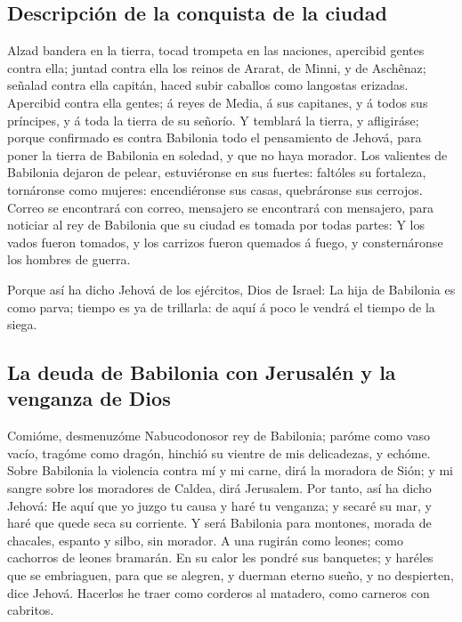 \hypertarget{descripciuxf3n-de-la-conquista-de-la-ciudad}{%
\subsection{Descripción de la conquista de la
ciudad}\label{descripciuxf3n-de-la-conquista-de-la-ciudad}}

 Alzad bandera en la tierra, tocad trompeta en las
naciones, apercibid gentes contra ella; juntad contra ella los reinos de
Ararat, de Minni, y de Aschênaz; señalad contra ella capitán, haced
subir caballos como langostas erizadas.  Apercibid contra
ella gentes; á reyes de Media, á sus capitanes, y á todos sus príncipes,
y á toda la tierra de su señorío.  Y temblará la tierra, y
afligiráse; porque confirmado es contra Babilonia todo el pensamiento de
Jehová, para poner la tierra de Babilonia en soledad, y que no haya
morador.  Los valientes de Babilonia dejaron de pelear,
estuviéronse en sus fuertes: faltóles su fortaleza, tornáronse como
mujeres: encendiéronse sus casas, quebráronse sus cerrojos.
 Correo se encontrará con correo, mensajero se encontrará
con mensajero, para noticiar al rey de Babilonia que su ciudad es tomada
por todas partes:  Y los vados fueron tomados, y los
carrizos fueron quemados á fuego, y consternáronse los hombres de
guerra.

 Porque así ha dicho Jehová de los ejércitos, Dios de
Israel: La hija de Babilonia es como parva; tiempo es ya de trillarla:
de aquí á poco le vendrá el tiempo de la siega.

\hypertarget{la-deuda-de-babilonia-con-jerusaluxe9n-y-la-venganza-de-dios}{%
\subsection{La deuda de Babilonia con Jerusalén y la venganza de
Dios}\label{la-deuda-de-babilonia-con-jerusaluxe9n-y-la-venganza-de-dios}}

 Comióme, desmenuzóme Nabucodonosor rey de Babilonia;
paróme como vaso vacío, tragóme como dragón, hinchió su vientre de mis
delicadezas, y echóme.  Sobre Babilonia la violencia contra
mí y mi carne, dirá la moradora de Sión; y mi sangre sobre los moradores
de Caldea, dirá Jerusalem.  Por tanto, así ha dicho Jehová:
He aquí que yo juzgo tu causa y haré tu venganza; y secaré su mar, y
haré que quede seca su corriente.  Y será Babilonia para
montones, morada de chacales, espanto y silbo, sin morador.
 A una rugirán como leones; como cachorros de leones
bramarán.  En su calor les pondré sus banquetes; y haréles
que se embriaguen, para que se alegren, y duerman eterno sueño, y no
despierten, dice Jehová.  Hacerlos he traer como corderos
al matadero, como carneros con cabritos.


